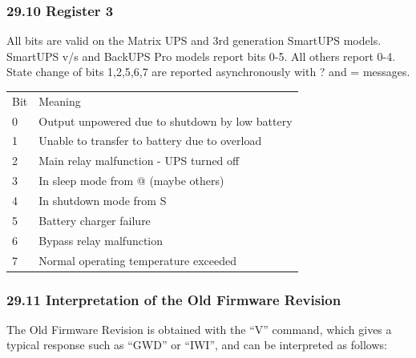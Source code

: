 \label{Register-3}

\subsubsection*{29.10 Register 3}

All bits are valid on the Matrix UPS and 3rd generation SmartUPS models.
SmartUPS v/s and BackUPS Pro models report bits 0-5. All others report 0-4.
State change of bits 1,2,5,6,7 are reported asynchronously with ? and =
messages.  

\begin{longtable}{ll}
{Bit} & {Meaning 
 } \\
{0} & {Output unpowered due to shutdown by low battery 
 } \\
{1} & {Unable to transfer to battery due to overload 
 } \\
{2} & {Main relay malfunction - UPS turned off 
 } \\
{3} & {In sleep mode from @ (maybe others) 
 } \\
{4} & {In shutdown mode from S 
 } \\
{5} & {Battery charger failure 
 } \\
{6} & {Bypass relay malfunction 
 } \\
{7} & {Normal operating temperature exceeded  
}

\end{longtable}

\label{Interpretation-of-the-Old-Firmware-Revision}

\subsubsection*{29.11 Interpretation of the Old Firmware Revision}

The Old Firmware Revision is obtained with the ``V'' command, which gives a
typical response such as ``GWD'' or ``IWI'', and can be interpreted as
follows: 

